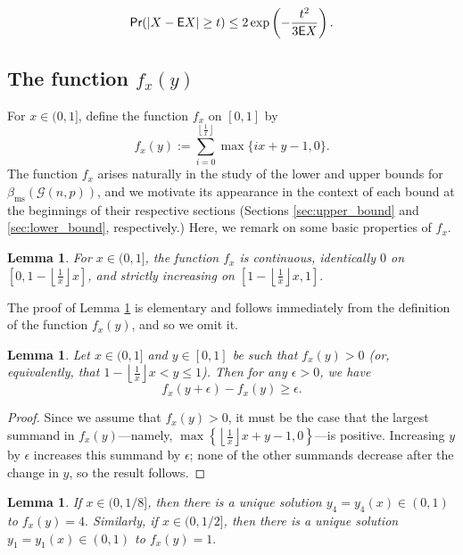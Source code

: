 \documentclass[12pt]{article}
\newtheorem{lemma}[theorem]{Lemma}
\theoremstyle{definition}
\theoremstyle{remark}
\theoremstyle{remark}
\numberwithin{theorem}{section}
\newcommand{\E}{\textsf{\upshape E}}
\newcommand{\prob}{\textsf{\upshape Pr}}
\newcommand{\Gnp}{\mathcal{G}(n,p)}
\begin{document}
	\begin{equation}\label{chern3}
		\prob(|X - \E X| \geq t ) \leq 2 \exp \left(  - \frac {t^2}{3 \E X } \right).
	\end{equation}

\subsection{The function $f_{x}(y)$}
For $x \in (0,1]$, define the function $f_{x}$ on $[0,1]$ by
$$
	f_{x}(y) := \sum_{i=0}^{\left\lfloor \frac{1}{x} \right\rfloor}\max\{ix +y- 1,0\}.
$$
The function $f_{x}$ arises naturally in the study of the lower and upper bounds for $\beta_{\text{ms}}(\Gnp)$, and we motivate its appearance in the context of each bound at the beginnings of their respective sections (Sections \ref{sec:upper_bound} and \ref{sec:lower_bound}, respectively.) Here, we remark on some basic properties of $f_{x}$.

\begin{lemma}\label{lem:exponent_func1}
	For $x \in (0,1]$, the function $f_{x}$ is continuous, identically $0$ on $\left[0, 1-\left\lfloor\frac{1}{x}\right\rfloor x\right]$, and strictly increasing on $\left[1-\left\lfloor\frac{1}{x}\right\rfloor x, 1\right].$
\end{lemma}

The proof of Lemma \ref{lem:exponent_func1} is elementary and follows immediately from the definition of the function $f_{x}(y)$, and so we omit it.

\begin{lemma}\label{lem:exponent_func2}
	Let $x \in (0,1]$ and $y \in [0,1]$ be such that $f_{x}(y) > 0$ (or, equivalently, that $1-\left\lfloor\frac{1}{x}\right\rfloor x < y \leq 1$). Then for any $\epsilon > 0$, we have
	$$
		f_{x}(y+\epsilon) - f_{x}(y) \geq \epsilon.
	$$
\end{lemma}

\begin{proof} 
	Since we assume that $f_{x}(y) > 0$, it must be the case that the largest summand in $f_{x}(y)$---namely, $\max\left\{\left\lfloor\frac{1}{x}\right\rfloor x + y - 1,0\right\}$---is positive. Increasing $y$ by $\epsilon$ increases this summand by $\epsilon$; none of the other summands decrease after the change in $y$, so the result follows.
\end{proof}

\begin{lemma}\label{lem:y1_and_y4}
    If $x \in (0,1/8]$, then there is a unique solution $y_{4} = y_{4}(x) \in (0,1)$ to $f_{x}(y) = 4.$ Similarly, if $x \in (0,1/2]$, then there is a unique solution $y_{1} = y_{1}(x) \in (0,1)$ to $f_{x}(y) = 1.$
\end{lemma}
\end{document}
